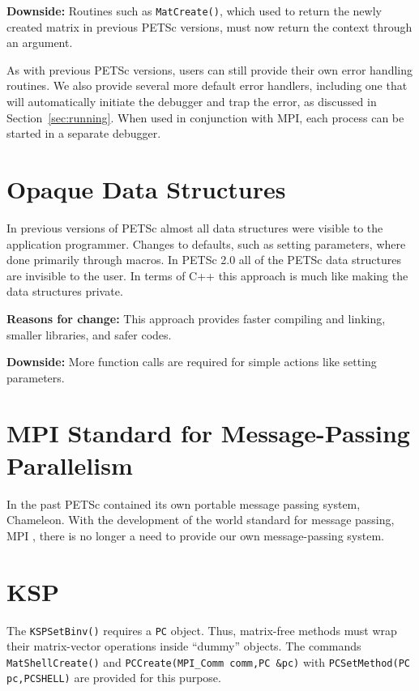 {\bf Downside:} Routines such as {\tt MatCreate()}, which used to return 
the newly created matrix in previous PETSc versions, must now return the
context through an argument.

As with previous PETSc versions, users can still provide their own error 
handling routines.  We also provide several more default error handlers,
including one that will automatically initiate the debugger and trap the 
error, as discussed in Section~\ref{sec:running}.  When used in conjunction 
with MPI, each process can be started in a separate debugger. 

\section{Opaque Data Structures}

In previous versions of PETSc almost all data structures were 
visible to the application programmer. Changes to defaults, such as 
setting parameters, where done primarily through macros.  In PETSc 2.0 
all of the PETSc data structures are invisible to the user. In terms of 
C++ this approach is much like making the data structures private.

{\bf Reasons for change:}  This approach provides faster compiling and 
linking, smaller libraries, and safer codes.

{\bf Downside:} More function calls are required for simple actions 
like setting parameters.

\section{MPI Standard for Message-Passing Parallelism}

In the past PETSc contained its own portable message passing system,
Chameleon.  With the development of the world standard for message
passing, MPI \cite{MPI-final}, there is no longer a need to provide 
our own message-passing system.

\section{KSP}

The {\tt KSPSetBinv()} requires a {\tt PC} object. Thus, matrix-free 
methods must wrap their matrix-vector operations inside ``dummy'' 
objects. The commands {\tt MatShellCreate()} and
 {\tt PCCreate(MPI\_Comm comm,PC \&pc)}
with {\tt PCSetMethod(PC pc,PCSHELL)} 
are provided for this purpose.

